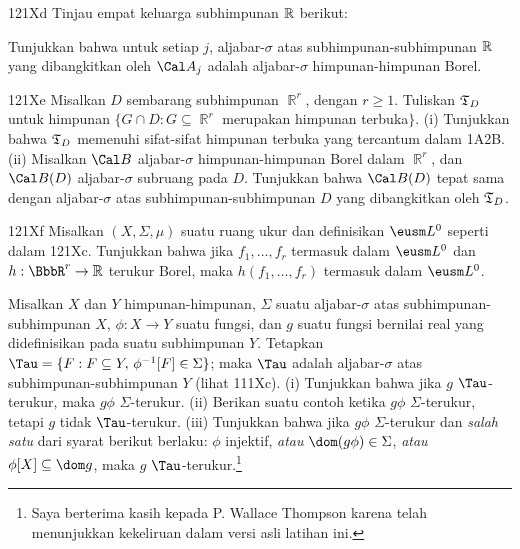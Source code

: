 {\sqheader 121Xd Tinjau empat keluarga subhimpunan $\Bbb R$ berikut:



\noindent Tunjukkan bahwa untuk setiap $j$, aljabar-$\sigma$ atas
subhimpunan-subhimpunan $\Bbb R$ yang dibangkitkan oleh $\Cal A_j$
adalah aljabar-$\sigma$ himpunan-himpunan Borel.

\spheader 121Xe Misalkan $D$ sembarang subhimpunan $\BbbR^r$, dengan
$r\ge 1$. Tuliskan $\frak T_D$ untuk himpunan
$\{G\cap D:G\subseteq\BbbR^r$ merupakan himpunan terbuka$\}$.
(i) Tunjukkan bahwa $\frak T_D$ memenuhi sifat-sifat himpunan terbuka
yang tercantum dalam 1A2B. (ii) Misalkan $\Cal B$ aljabar-$\sigma$
himpunan-himpunan Borel dalam $\BbbR^r$, dan $\Cal B(D)$
aljabar-$\sigma$ subruang pada $D$. Tunjukkan bahwa $\Cal B(D)$ tepat
sama dengan aljabar-$\sigma$ atas subhimpunan-subhimpunan $D$ yang
dibangkitkan oleh $\frak T_D$. 

\spheader 121Xf Misalkan $(X,\Sigma,\mu)$ suatu ruang ukur dan
definisikan $\eusm L^0$ seperti dalam 121Xc. Tunjukkan bahwa jika
$f_1,\ldots,f_r$ termasuk dalam $\eusm L^0$ dan
$h:\BbbR^r\to\Bbb R$ terukur Borel, maka $h(f_1,\ldots,f_r)$
termasuk dalam $\eusm L^0$.

Misalkan $X$ dan $Y$ himpunan-himpunan, $\Sigma$ suatu
aljabar-$\sigma$ atas subhimpunan-subhimpunan $X$, $\phi:X\to Y$ suatu
fungsi, dan $g$ suatu fungsi bernilai real yang didefinisikan pada suatu
subhimpunan $Y$. Tetapkan
$\Tau=\{F:F\subseteq Y,\,\phi^{-1}[F]\in\Sigma\}$; maka $\Tau$ adalah
aljabar-$\sigma$ atas subhimpunan-subhimpunan $Y$ (lihat 111Xc).
(i) Tunjukkan bahwa jika $g$ $\Tau$-terukur, maka $g\phi$
$\Sigma$-terukur.
(ii) Berikan suatu contoh ketika $g\phi$ $\Sigma$-terukur, tetapi $g$
tidak $\Tau$-terukur.
(iii) Tunjukkan bahwa jika $g\phi$ $\Sigma$-terukur dan
{\it salah satu} dari syarat berikut berlaku: $\phi$ injektif,
{\it atau} $\dom(g\phi)\in\Sigma$, {\it atau}
$\phi[X]\subseteq\dom g$, maka $g$ $\Tau$-terukur.\footnote{Saya
berterima kasih kepada P. Wallace Thompson karena telah menunjukkan
kekeliruan dalam versi asli latihan ini.}

}
